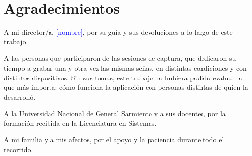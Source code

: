 \documentclass[12pt,a4paper,oneside]{report}
\begin{document}

\chapter*{Agradecimientos}

A mi director/a, \textcolor{blue}{[nombre]}, por su guía y sus devoluciones a lo largo de este trabajo.

A las personas que participaron de las sesiones de captura, que dedicaron su tiempo a grabar una y otra vez las mismas señas, en distintas condiciones y con distintos dispositivos. Sin sus tomas, este trabajo no hubiera podido evaluar lo que más importa: cómo funciona la aplicación con personas distintas de quien la desarrolló.

A la Universidad Nacional de General Sarmiento y a sus docentes, por la formación recibida en la Licenciatura en Sistemas.

A mi familia y a mis afectos, por el apoyo y la paciencia durante todo el recorrido.




\clearpage
{}
{}
\listoffigures

\clearpage
{}
{}
\listoftables

\tableofcontents
\clearpage













\clearpage
{}



\appendix

\end{document}
